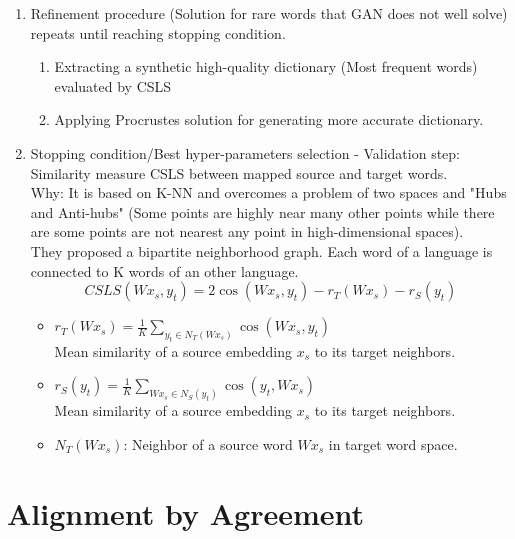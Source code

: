 \documentclass{article}
\begin{document}
\begin{enumerate}
\begin{itemize}
	
	\end{itemize}
\item Refinement procedure (Solution for rare words that GAN does not well solve) repeats until reaching stopping condition.
	\begin{enumerate}
	\item Extracting a synthetic high-quality dictionary (Most frequent words) evaluated by CSLS
	\item Applying Procrustes solution for generating more accurate dictionary.
	\end{enumerate}
\item Stopping condition/Best hyper-parameters selection - Validation step: Similarity measure CSLS between mapped source and target words.\\
	Why: It is based on K-NN and overcomes a problem of two spaces and "Hubs and Anti-hubs" (Some points are highly near many other points while there are some points are not nearest any point in high-dimensional spaces).\\
	They proposed a bipartite neighborhood graph. Each word of a language is connected to K words of an other language.
	\begin{equation}
	CSLS(Wx_{s}, y_{t}) = 2 \cos(Wx_{s}, y_{t}) - r_{T}(Wx_{s}) - r_{S}(y_{t})
	\end{equation}
		\begin{itemize}
		\item $r_{T}(Wx_{s}) = \frac{1}{K} \sum_{y_{t} \in N_{T}(Wx_{s})} \cos(Wx_{s}, y_{t})$\\
		Mean similarity of a source embedding $x_{s}$ to its target neighbors.
		\item $r_{S}(y_{t}) = \frac{1}{K} \sum_{Wx_{s} \in N_{S}(y_{t})} \cos(y_{t}, Wx_{s})$\\
		Mean similarity of a source embedding $x_{s}$ to its target neighbors.
		\item $N_{T}(Wx_{s})$: Neighbor of a source word $Wx_{s}$ in target word space.
		\end{itemize}

\end{enumerate}

\section{Alignment by Agreement \citep{Liang2006Alignment}}
\end{document}
